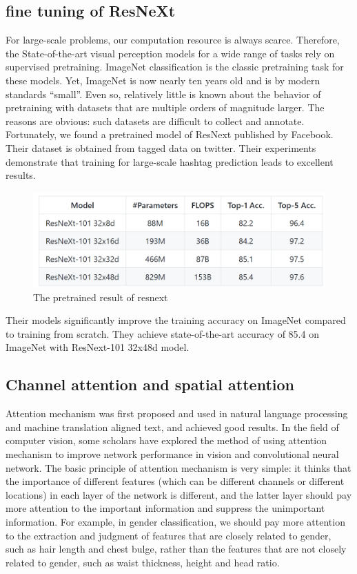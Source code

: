 \subsection {fine tuning of ResNeXt}
For large-scale problems, our computation resource is always scarce. Therefore, the State-of-the-art visual perception models for a wide range of tasks rely on supervised pretraining. ImageNet classification is the classic pretraining task for these models. Yet, ImageNet is now nearly ten
years old and is by modern standards “small”. Even so, relatively little is
known about the behavior of pretraining with datasets that are multiple
orders of magnitude larger. The reasons are obvious: such datasets are
difficult to collect and annotate. Fortunately, we found a pretrained model of ResNext published by Facebook. Their dataset is obtained from tagged data on twitter. Their experiments demonstrate that training for large-scale hashtag prediction leads to excellent
results. 

\begin{figure}[H]
  \centering
  \includegraphics[width=\linewidth]{figs/pretrained-resnext.png}
  \caption{The pretrained result of resnext}
  \label{fig:example}
\end{figure}

Their models significantly improve the training accuracy on ImageNet compared to training from scratch. They achieve state-of-the-art accuracy of 85.4 on ImageNet with ResNext-101 32x48d model.


\subsection{Channel attention and spatial attention}

Attention mechanism was first proposed and used in natural language processing and machine translation aligned text, and achieved good results. In the field of computer vision, some scholars have explored the method of using attention mechanism to improve network performance in vision and convolutional neural network. The basic principle of attention mechanism is very simple: it thinks that the importance of different features (which can be different channels or different locations) in each layer of the network is different, and the latter layer should pay more attention to the important information and suppress the unimportant information. For example, in gender classification, we should pay more attention to the extraction and judgment of features that are closely related to gender, such as hair length and chest bulge, rather than the features that are not closely related to gender, such as waist thickness, height and head ratio.


